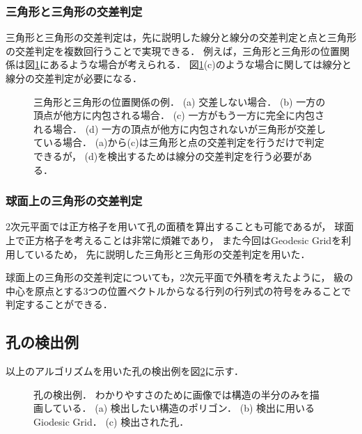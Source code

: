 \subsubsection{三角形と三角形の交差判定}
三角形と三角形の交差判定は，先に説明した線分と線分の交差判定と点と三角形の交差判定を複数回行うことで実現できる．
例えば，三角形と三角形の位置関係は図\ref{fig:triangle_triangle}にあるような場合が考えられる．
図\ref{fig:triangle_triangle}(c)のような場合に関しては線分と線分の交差判定が必要になる．

\begin{figure}
\centering

\caption{
    三角形と三角形の位置関係の例．
    (a) 交差しない場合．
    (b) 一方の頂点が他方に内包される場合．
    (c) 一方がもう一方に完全に内包される場合．
    (d) 一方の頂点が他方に内包されないが三角形が交差している場合．
        (a)から(c)は三角形と点の交差判定を行うだけで判定できるが，
        (d)を検出するためは線分の交差判定を行う必要がある．
}
\label{fig:triangle_triangle}
\end{figure}

\subsubsection{球面上の三角形の交差判定}
2次元平面では正方格子を用いて孔の面積を算出することも可能であるが，
球面上で正方格子を考えることは非常に煩雑であり，
また今回はGeodesic Gridを利用しているため，
先に説明した三角形と三角形の交差判定を用いた．

球面上の三角形の交差判定についても，2次元平面で外積を考えたように，
級の中心を原点とする3つの位置ベクトルからなる行列の行列式の符号をみることで判定することができる．


\subsection{孔の検出例}
以上のアルゴリズムを用いた孔の検出例を図\ref{fig:hole_detection}に示す．

\begin{figure}
\centering

\caption{
    孔の検出例．
    わかりやすさのために画像では構造の半分のみを描画している．
    (a) 検出したい構造のポリゴン．
    (b) 検出に用いるGiodesic Grid．
    (c) 検出された孔．
}
\label{fig:hole_detection}
\end{figure}
